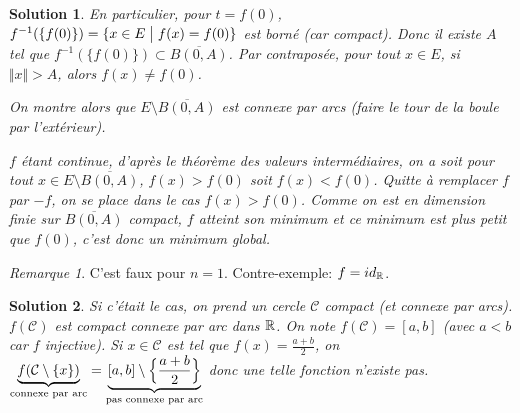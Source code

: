 \documentclass[12pt]{article}
\newtheorem{solution}{Solution}[section]
\theoremstyle{remark}
\newtheorem{remark}{Remarque}[section]
\numberwithin{equation}{section}
\begin{document}
\begin{solution}
	En particulier, pour $t=f(0)$, $f^{-1}(\{f(0)\})=\{x\in E\bigm| f(x)=f(0)\}$ est borné (car compact). Donc il existe $A$ tel que $f^{-1}(\{f(0)\})\subset\overline{B(0,A)}$. Par contraposée, pour tout $x\in E$, si $\Vert x\Vert>A$, alors $f(x)\neq f(0)$.

	On montre alors que $E\setminus\overline{B(0,A)}$ est connexe par arcs (faire le tour de la boule par l'extérieur).

	$f$ étant continue, d'après le théorème des valeurs intermédiaires, on a soit pour tout $x\in E\setminus\overline{B(0,A)}$, $f(x)>f(0)$ soit $f(x)<f(0)$. Quitte à remplacer $f$ par $-f$, on se place dans le cas $f(x)>f(0)$. Comme on est en dimension finie sur $\overline{B(0,A)}$ compact, $f$ atteint son minimum et ce minimum est plus petit que $f(0)$, c'est donc un minimum global.
\end{solution}

\begin{remark}
	C'est faux pour $n=1$. Contre-exemple: $f=id_{\mathbb{R}}$.
\end{remark}

\begin{solution}
	Si c'était le cas, on prend un cercle $\mathcal{C}$ compact (et connexe par arcs). $f(\mathcal{C})$ est compact connexe par arc dans $\mathbb{R}$. On note $f(\mathcal{C})=[a,b]$ (avec $a<b$ car $f$ injective). Si $x\in\mathcal{C}$ est tel que $f(x)=\frac{a+b}{2}$, on $\underbrace{f(\mathcal{C}\setminus\{x\})}_{\text{connexe par arc}}=\underbrace{[a,b]\setminus\Bigl\{\frac{a+b}{2}\Bigr\}}_{\text{pas connexe par arc}}$ donc une telle fonction n'existe pas.
\end{solution}
\end{document}
